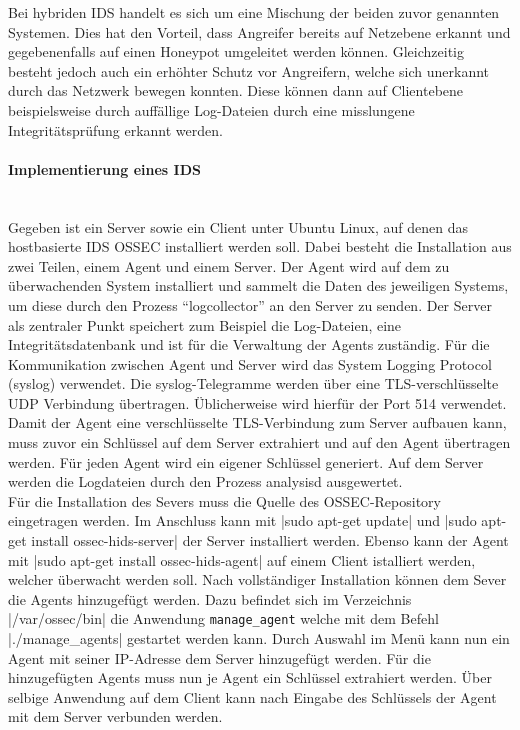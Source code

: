 \noindent Bei hybriden \ac{IDS} handelt es sich um eine Mischung der beiden zuvor genannten Systemen. Dies hat den Vorteil, dass Angreifer bereits auf Netzebene erkannt und gegebenenfalls auf einen Honeypot umgeleitet werden können. Gleichzeitig besteht jedoch auch ein erhöhter Schutz vor Angreifern, welche sich unerkannt durch das Netzwerk bewegen konnten. Diese können dann auf Clientebene beispielsweise durch auffällige Log-Dateien durch eine misslungene Integritätsprüfung erkannt werden.\\

\paragraph{Implementierung eines IDS}
\noindent \\Gegeben ist ein Server sowie ein Client unter Ubuntu Linux, auf denen das hostbasierte IDS OSSEC installiert werden soll. Dabei besteht die Installation aus zwei Teilen, einem Agent und einem Server. Der Agent wird auf dem zu überwachenden System installiert und sammelt die Daten des jeweiligen Systems, um diese durch den Prozess "`logcollector"' an den Server zu senden. Der Server als zentraler Punkt speichert zum Beispiel die Log-Dateien, eine Integritätsdatenbank und ist für die Verwaltung der Agents zuständig. Für die Kommunikation zwischen Agent und Server wird das System Logging Protocol (syslog) verwendet. Die syslog-Telegramme werden über eine TLS-verschlüsselte UDP Verbindung übertragen. Üblicherweise wird hierfür der Port 514 verwendet. Damit der Agent eine verschlüsselte TLS-Verbindung zum Server aufbauen kann, muss zuvor ein Schlüssel auf dem Server extrahiert und auf den Agent übertragen werden. Für jeden Agent wird ein eigener Schlüssel generiert. Auf dem Server werden die Logdateien durch den Prozess analysisd ausgewertet.\\

\noindent Für die Installation des Severs muss die Quelle des OSSEC-Repository eingetragen werden. Im Anschluss kann mit |sudo apt-get update| und |sudo apt-get install ossec-hids-server| der Server installiert werden. 
Ebenso kann der Agent mit |sudo apt-get install ossec-hids-agent| auf einem Client istalliert werden, welcher überwacht werden soll. Nach vollständiger Installation können dem Sever die Agents hinzugefügt werden. Dazu befindet sich im Verzeichnis |/var/ossec/bin| die Anwendung \verb+manage_agent+ welche mit dem Befehl |./manage_agents| gestartet werden kann. 
Durch Auswahl im Menü kann nun ein Agent mit seiner IP-Adresse dem Server hinzugefügt werden. Für die hinzugefügten Agents muss nun je Agent ein Schlüssel extrahiert werden. Über selbige Anwendung auf dem Client kann nach Eingabe des Schlüssels der Agent mit dem Server verbunden werden.\\


